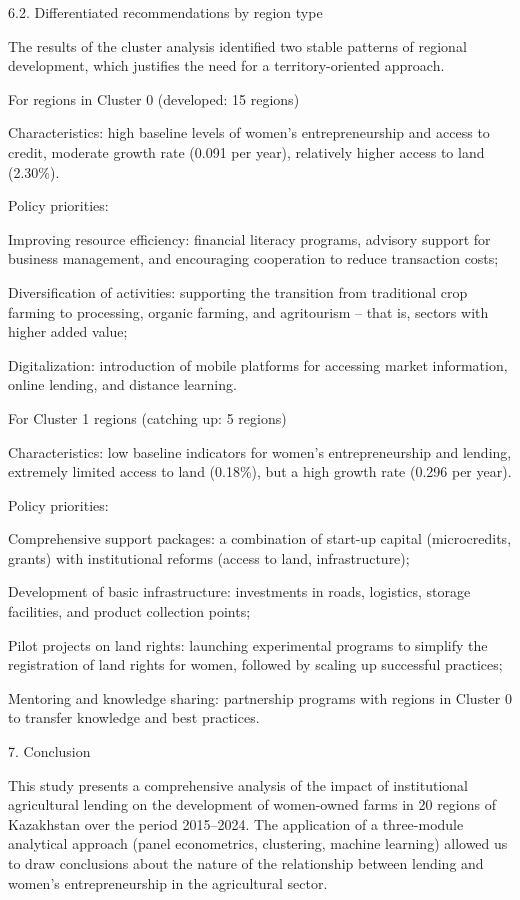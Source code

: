 6.2. Differentiated recommendations by region type

The results of the cluster analysis identified two stable patterns of
regional development, which justifies the need for a territory-oriented
approach.

For regions in Cluster 0 (developed: 15 regions)

Characteristics: high baseline levels of women's entrepreneurship and
access to credit, moderate growth rate (0.091 per year), relatively
higher access to land (2.30\%).

Policy priorities:

Improving resource efficiency: financial literacy programs, advisory
support for business management, and encouraging cooperation to reduce
transaction costs;

Diversification of activities: supporting the transition from
traditional crop farming to processing, organic farming, and agritourism
-- that is, sectors with higher added value;

Digitalization: introduction of mobile platforms for accessing market
information, online lending, and distance learning.

For Cluster 1 regions (catching up: 5 regions)

Characteristics: low baseline indicators for women's entrepreneurship
and lending, extremely limited access to land (0.18\%), but a high
growth rate (0.296 per year).

Policy priorities:

Comprehensive support packages: a combination of start-up capital
(microcredits, grants) with institutional reforms (access to land,
infrastructure);

Development of basic infrastructure: investments in roads, logistics,
storage facilities, and product collection points;

Pilot projects on land rights: launching experimental programs to
simplify the registration of land rights for women, followed by scaling
up successful practices;

Mentoring and knowledge sharing: partnership programs with regions in
Cluster 0 to transfer knowledge and best practices.

7. Conclusion

This study presents a comprehensive analysis of the impact of
institutional agricultural lending on the development of women-owned
farms in 20 regions of Kazakhstan over the period 2015--2024. The
application of a three-module analytical approach (panel econometrics,
clustering, machine learning) allowed us to draw conclusions about the
nature of the relationship between lending and women's entrepreneurship
in the agricultural sector.

